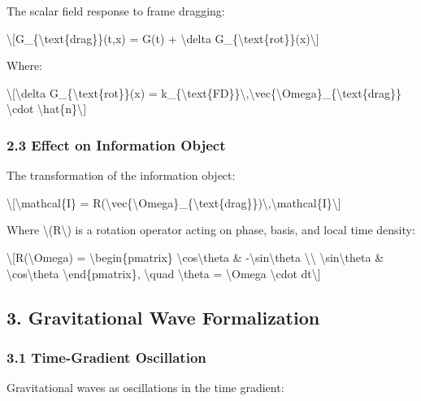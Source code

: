 \documentclass[
  10pt,
]{article}
\begin{document}
The scalar field response to frame dragging:

\textbackslash{[}G\_\{\textbackslash text\{drag\}\}(t,x) = G(t) +
\textbackslash delta
G\_\{\textbackslash text\{rot\}\}(x)\textbackslash{]}

Where:

\textbackslash{[}\textbackslash delta
G\_\{\textbackslash text\{rot\}\}(x) =
k\_\{\textbackslash text\{FD\}\}\textbackslash,\textbackslash vec\{\textbackslash Omega\}\_\{\textbackslash text\{drag\}\}
\textbackslash cdot \textbackslash hat\{n\}\textbackslash{]}

\hypertarget{effect-on-information-object}{%
\subsubsection{2.3 Effect on Information
Object}\label{effect-on-information-object}}

The transformation of the information object:

\textbackslash{[}\textbackslash mathcal\{I\}\textquotesingle{} =
R(\textbackslash vec\{\textbackslash Omega\}\_\{\textbackslash text\{drag\}\})\textbackslash,\textbackslash mathcal\{I\}\textbackslash{]}

Where \textbackslash(R\textbackslash) is a rotation operator acting on
phase, basis, and local time density:

\textbackslash{[}R(\textbackslash Omega) =
\textbackslash begin\{pmatrix\} \textbackslash cos\textbackslash theta
\& -\textbackslash sin\textbackslash theta
\textbackslash\textbackslash{} \textbackslash sin\textbackslash theta \&
\textbackslash cos\textbackslash theta \textbackslash end\{pmatrix\},
\textbackslash quad \textbackslash theta = \textbackslash Omega
\textbackslash cdot dt\textbackslash{]}

\hypertarget{gravitational-wave-formalization}{%
\subsection{3. Gravitational Wave
Formalization}\label{gravitational-wave-formalization}}

\hypertarget{time-gradient-oscillation}{%
\subsubsection{3.1 Time-Gradient
Oscillation}\label{time-gradient-oscillation}}

Gravitational waves as oscillations in the time gradient:
\end{document}

